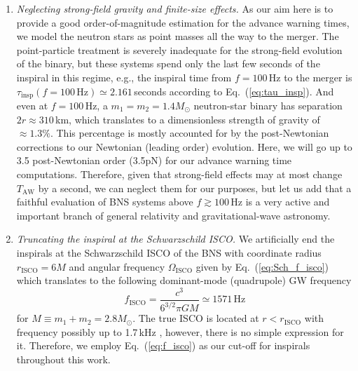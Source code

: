 \documentclass[prd,amsmath,amssymb,aps,floats,amsfonts,notitlepage,superscriptaddress,eqsecnum,nofootinbib,10pt]{revtex4-1}
\newcommand{\f}{\frac}
\newcommand{\be}{\begin{equation}}
\newcommand{\ee}{\end{equation}}
\begin{document}
\begin{enumerate}
 \item {\it Neglecting strong-field gravity and finite-size effects.}
As our aim here is to provide a good order-of-magnitude estimation for the advance warning times, we model the neutron stars as point masses %
all the way to the merger. The point-particle treatment is severely inadequate for the strong-field evolution of the binary, but these systems spend only the last few seconds of the inspiral in this regime, e.g., the inspiral time from $f=100\,$Hz to the merger is
$\tau_\text{insp}(f=100\,\text{Hz})\simeq 2.161\,$seconds according to Eq.~(\ref{eq:tau_insp}).
And even at $f=100\,$Hz, a $m_1=m_2=1.4M_\odot$ neutron-star binary has separation $2r\approx 310\,$km, which translates to a dimensionless strength of gravity of $\approx 1.3\%$.
This percentage is mostly accounted for by the post-Newtonian
corrections to our Newtonian (leading order) evolution. 
Here, we will go up to 3.5 post-Newtonian order (3.5pN) for our
advance warning time computations.
Therefore, given that strong-field effects may at most change
$T_\text{AW}$ by a second, we can neglect them for our purposes,
but let us add that a faithful evaluation of BNS systems above $f\gtrsim 100\,$Hz is a very active and important branch of general relativity and gravitational-wave astronomy. %
%
\item {\it Truncating the inspiral at the Schwarzschild ISCO.}
We artificially end the inspirals at the Schwarzschild ISCO of the BNS with coordinate radius $r_\text{ISCO} = 6M$ and angular frequency $\Omega_\text{ISCO}$ %
given by Eq.~(\ref{eq:Sch_f_isco}) which translates to the following dominant-mode (quadrupole) GW frequency
\be
f_\text{ISCO} = \f{c^3}{6^{3/2}\pi G M} \simeq 1571\,\text{Hz} \label{eq:f_isco}
\ee
for $M \equiv m_1+m_2 = 2.8 M_\odot$. The true ISCO is located at $r< r_\text{ISCO}$ with frequency possibly up to 1.7\,kHz \cite{Marronetti:2003hx}, 
however, there is no simple expression for it.
Therefore, we employ Eq.~(\ref{eq:f_isco}) as our cut-off for
inspirals throughout this work.

\end{enumerate}
\end{document}
